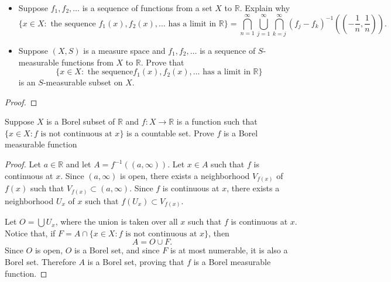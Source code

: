 \documentclass[14.5pt]{article}
\newcommand{\N}{\mathbb{N}}
\newcommand{\R}{\mathbb{R}}
\newenvironment{problem}[2][Problem]{\begin{mdframed}[backgroundcolor=gray!10, leftline = false, rightline=false, linewidth=0.25pt]  \begin{trivlist}
\item[\hskip \labelsep {\bfseries #1}\hskip \labelsep {\bfseries #2.}]}{\end{trivlist} \end{mdframed}  }
\begin{document}
\begin{problem}{2B.14} \text{ }
\begin{itemize} 
    \item[(a)] Suppose $f_1, f_2, \ldots$ is a sequence of functions from a set $X$ to $\R$. Explain why
    $$\{x \in X: \text{ the sequence  } f_1(x), f_2(x), \ldots \text{ has a limit in } \R\} = \bigcap_{n=1}^\infty \bigcup_{j=1}^\infty \bigcap_{k=j}^\infty (f_j - f_k)^{-1}\left( \left( -\frac{1}{n}, \frac{1}{n} \right) \right). $$
    \item[(b)] Suppose $(X, S)$ is a measure space and $f_1, f_2, \ldots$ is a sequence of $S$-measurable functions from $X$ to $\R$. Prove that 
    $$\{x \in X: \text{ the sequence} f_1(x), f_2(x), \ldots \text{ has a limit in } \R \}$$
    is an $S$-measurable subset on $X.$
\end{itemize}
\end{problem}
\begin{proof}

\end{proof}

\begin{problem}{2B.17}
Suppose $X$ is a Borel subset of $\R$ and $f: X \rightarrow \R$ is a function such that $\{x \in X: f \text{ is not continuous at } x \}$ is a countable set. Prove $f$ is a Borel measurable function
\end{problem}
\begin{proof}
    Let $a\in \R$ and let $A = f^{-1}((a, \infty))$. Let $x \in A$ such that $f$ is continuous at $x.$ Since $(a, \infty)$ is open, there exists a neighborhood $V_{f(x)}$ of $f(x)$ such that $V_{f(x)} \subset (a, \infty).$ Since $f$ is continuous at $x$, there exists a neighborhood $U_x$ of $x$ such that $f(U_x) \subset V_{f(x)}.$
    
    Let $O = \bigcup U_x$, where the union is taken over all $x$ such that $f$ is continuous at $x.$ Notice that, if $F = A \cap \{x \in X: f \text{ is not continuous at } x \}$, then
    $$ A = O \cup F.$$
    Since $O$ is open, $O$ is a Borel set, and since $F$ is at most numerable, it is also a Borel set. Therefore $A$ is a Borel set, proving that $f$ is a Borel measurable function.
\end{proof}
\end{document}
